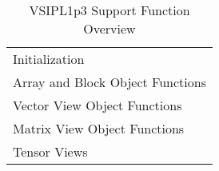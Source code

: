 \begin{table}[H]
\caption{VSIPL1p3 Support Function Overview}
\label{tab:vsiplAPISupport}
\begin{center}
\begin{tabular}{l}
Initialization\\
Array and Block Object Functions\\
Vector View Object Functions\\
Matrix View Object Functions\\
Tensor Views\\
\end{tabular}
\end{center}
\label{default}
\end{table}%